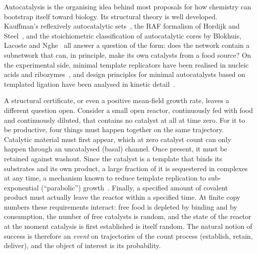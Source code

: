 \documentclass[11pt,a4paper]{article}
\theoremstyle{plain}
\theoremstyle{definition}
\theoremstyle{remark}
\begin{document}
Autocatalysis is the organising idea behind most proposals for how chemistry can bootstrap itself toward biology. Its structural theory is well developed. Kauffman's reflexively autocatalytic sets~\citep{kauffman1986}, the RAF formalism of Hordijk and Steel~\citep{hordijk2004,hordijk2017,steel2019}, and the stoichiometric classification of autocatalytic cores by Blokhuis, Lacoste and Nghe~\citep{blokhuis2020} all answer a question of the form: does the network contain a subnetwork that can, in principle, make its own catalysts from a food source? On the experimental side, minimal template replicators have been realised in nucleic acids and ribozymes~\citep{vonkiedrowski1986,sievers1994,lincoln2009}, and design principles for minimal autocatalysts based on templated ligation have been analysed in kinetic detail~\citep{sakref2024}.

A structural certificate, or even a positive mean-field growth rate, leaves a different question open. Consider a small open reactor, continuously fed with food and continuously diluted, that contains no catalyst at all at time zero. For it to be productive, four things must happen together on the same trajectory. Catalytic material must first appear, which at zero catalyst count can only happen through an uncatalysed (basal) channel. Once present, it must be retained against washout. Since the catalyst is a template that binds its substrates and its own product, a large fraction of it is sequestered in complexes at any time, a mechanism known to reduce template replication to sub-exponential (``parabolic'') growth~\citep{szathmary1989}. Finally, a specified amount of covalent product must actually leave the reactor within a specified time. At finite copy numbers these requirements interact: free food is depleted by binding and by consumption, the number of free catalysts is random, and the state of the reactor at the moment catalysis is first established is itself random. The natural notion of success is therefore an \emph{event} on trajectories of the count process (establish, retain, deliver), and the object of interest is its probability.
\end{document}

